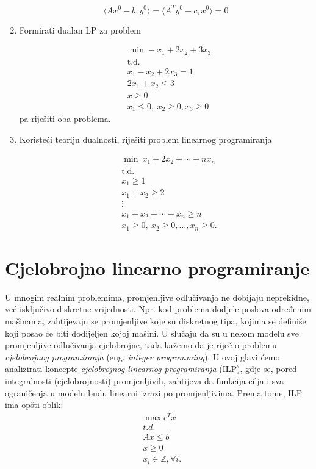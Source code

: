 \documentclass[b5paper, utf8, 11pt, colorlinks]{book}
\theoremstyle{definition}
\begin{document}
\begin{enumerate}
	$$\langle Ax^0-b,y^0\rangle=\langle A^Ty^0-c,x^0\rangle=0$$
	
	\item Formirati dualan LP za problem
 
	 \begin{align}
		&\min  -x_1+2x_2+3x_3\nonumber \\
		&\mbox{t.d.} \nonumber \\
		 & x_1-x_2+2x_3=1\nonumber\\
		 & 2x_1+x_2\leqslant 3\nonumber \\
		 & x \geq 0\nonumber \\
		 & x_1\leqslant 0,\ x_2\geqslant 0, x_3\geqslant 0 \nonumber
	\end{align}
	pa riješiti oba problema.
	
	\item Koristeći teoriju dualnosti, riješiti problem linearnog programiranja
	
	\begin{align}
		&\min\  x_1+2x_2+\cdots +nx_n\nonumber\\
			&\mbox{t.d.}\nonumber\\
		& x_1\geqslant 1\nonumber\\
		& x_1+x_2\geqslant 2 \nonumber\\
		& \vdots\nonumber\\
		& x_1+x_2+\cdots+x_n\geqslant n\nonumber\\
		&x_1\geqslant 0,\ x_2\geqslant 0,\ldots,x_n\geqslant 0.
	\end{align}
\end{enumerate}
\chapter{Cjelobrojno linearno programiranje}\label{chp:ilp}

U mnogim realnim problemima, promjenljive odlučivanja ne dobijaju neprekidne, već isključivo diskretne vrijednosti. Npr. kod problema dodjele poslova određenim mašinama, zahtijevaju se promjenljive koje su diskretnog tipa, kojima se definiše koji posao će biti dodijeljen kojoj mašini. U slučaju da su u nekom modelu sve promjenljive odlučivanja cjelobrojne, tada kažemo da je riječ o problemu \emph{cjelobrojnog programiranja} (eng. \emph{integer programming}). 
U ovoj glavi ćemo analizirati koncepte   \emph{cjelobrojnog linearnog programiranja} (ILP), gdje se, pored integralnosti (cjelobrojnosti) promjenljivih, zahtijeva da funkcija cilja  i sva ograničenja u modelu budu linearni izrazi po promjenljivima. Prema tome, ILP ima opšti oblik:
\begin{align}
	& \max c^T x \nonumber\\
	& t.d. \nonumber \\
	& A x \leq b \nonumber \\
	& x \geq 0 \nonumber\\
	& x_i \in \mathbb{Z}, \forall i. \label{ilp-formulation}
\end{align}
\end{document}

